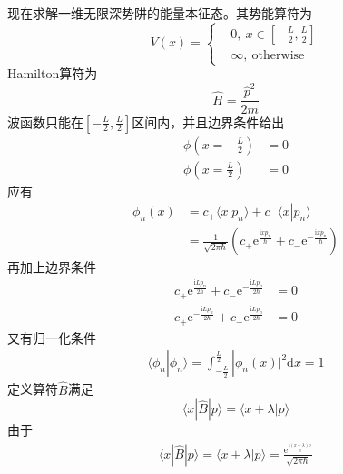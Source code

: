 \documentclass[12pt]{article}
\begin{document}
    现在求解一维无限深势阱的能量本征态。其势能算符为
    \begin{equation}
        V(x) = \left \{
            \begin{aligned}
                &0,\ x\in [-\frac L2, \frac L2 ]\\
                &\infty, \ \mathrm{otherwise}
            \end{aligned}
            \right.
    \end{equation}
    Hamilton算符为
    \begin{equation}
        \hat{H} = \frac {\hat{p}^2}{2m}
    \end{equation}
    波函数只能在$[-\frac L2, \frac L2 ]$区间内，并且边界条件给出
    \begin{equation}\begin{aligned}
        \phi(x = -\frac L2) &= 0\\
        \phi(x = \frac L2) &= 0
    \end{aligned}\end{equation}
    应有
    \begin{equation}\begin{aligned}
        \phi_n(x) &= c_+ \langle x|p_n\rangle + c_- \langle x|p_n\rangle\\
        &= \frac 1{\sqrt{2\pi \hbar}}(c_+\mathrm{e}^{\frac {\mathrm{i}xp_n}{\hbar}}+c_-\mathrm{e}^{-\frac {\mathrm{i}xp_n}{\hbar}})
    \end{aligned}\end{equation}
    再加上边界条件
    \begin{equation}\begin{aligned}
        c_+\mathrm{e}^{\frac {\mathrm{i}Lp_n}{2\hbar}}+c_-\mathrm{e}^{-\frac {\mathrm{i}Lp_n}{2\hbar}} &= 0\\
        c_+\mathrm{e}^{-\frac {\mathrm{i}Lp_n}{2\hbar}}+c_-\mathrm{e}^{\frac {\mathrm{i}Lp_n}{2\hbar}} &= 0
    \end{aligned}\end{equation}
    又有归一化条件
    \begin{equation}\begin{aligned}
        \langle \phi_n | \phi_n \rangle = \int_{-\frac L2}^{\frac L2} |\phi_n(x)|^2 \mathrm{d}x = 1
    \end{aligned}\end{equation}
    定义算符$\hat{B}$满足
    \[ \langle x|\hat{B}| p \rangle = \langle x+\lambda |p\rangle \]
    由于
    \begin{equation}\begin{aligned}
        \langle x|\hat{B}| p \rangle = \langle x+\lambda |p\rangle = \frac {\mathrm{e}^{\frac {\mathrm{i}(x+\lambda)p}{\hbar}}}{\sqrt{2\pi\hbar}}
    \end{aligned}\end{equation}
\end{document}
